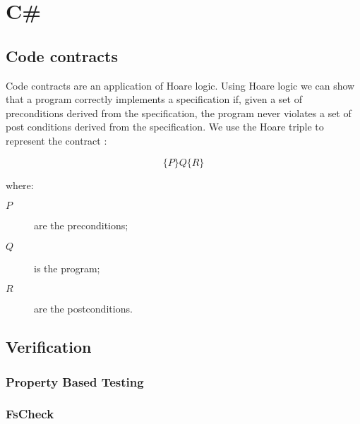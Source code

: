 
\chapter{C\#} %

\label{csharp} %

\section{Code contracts}

Code contracts are an application of Hoare logic. Using Hoare logic
we can show that a program correctly implements a specification if, given a set of 
preconditions derived from the specification, the program never violates a set of
post conditions derived from the specification. We use the Hoare triple to 
represent the contract \parencite{BasisForProgramming}:

\[
	\{P\}Q\{R\}
\]

where:
\begin{description}
	\item [$P$] are the preconditions;
	\item [$Q$] is the program;
	\item [$R$] are the postconditions.
\end{description}


\section{Verification}

\subsection{Property Based Testing}

\subsection{FsCheck}


